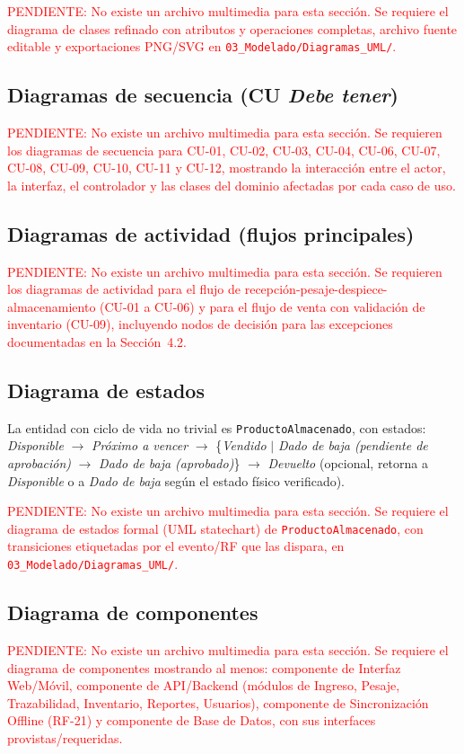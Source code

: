 \documentclass[11pt,a4paper]{article}
\begin{document}
\textcolor{red}{PENDIENTE: No existe un archivo multimedia para esta sección. Se requiere el diagrama de clases refinado con atributos y operaciones completas, archivo fuente editable y exportaciones PNG/SVG en \texttt{03\_Modelado/Diagramas\_UML/}.}

\subsection{Diagramas de secuencia (CU \textit{Debe tener})}
\textcolor{red}{PENDIENTE: No existe un archivo multimedia para esta sección. Se requieren los diagramas de secuencia para CU-01, CU-02, CU-03, CU-04, CU-06, CU-07, CU-08, CU-09, CU-10, CU-11 y CU-12, mostrando la interacción entre el actor, la interfaz, el controlador y las clases del dominio afectadas por cada caso de uso.}

\subsection{Diagramas de actividad (flujos principales)}
\textcolor{red}{PENDIENTE: No existe un archivo multimedia para esta sección. Se requieren los diagramas de actividad para el flujo de recepción-pesaje-despiece-almacenamiento (CU-01 a CU-06) y para el flujo de venta con validación de inventario (CU-09), incluyendo nodos de decisión para las excepciones documentadas en la Sección~4.2.}

\subsection{Diagrama de estados}
La entidad con ciclo de vida no trivial es \texttt{ProductoAlmacenado}, con estados: \textit{Disponible} $\rightarrow$ \textit{Próximo a vencer} $\rightarrow$ \{\textit{Vendido} $\mid$ \textit{Dado de baja (pendiente de aprobación)} $\rightarrow$ \textit{Dado de baja (aprobado)}\} $\rightarrow$ \textit{Devuelto} (opcional, retorna a \textit{Disponible} o a \textit{Dado de baja} según el estado físico verificado).

\textcolor{red}{PENDIENTE: No existe un archivo multimedia para esta sección. Se requiere el diagrama de estados formal (UML statechart) de \texttt{ProductoAlmacenado}, con transiciones etiquetadas por el evento/RF que las dispara, en \texttt{03\_Modelado/Diagramas\_UML/}.}

\subsection{Diagrama de componentes}
\textcolor{red}{PENDIENTE: No existe un archivo multimedia para esta sección. Se requiere el diagrama de componentes mostrando al menos: componente de Interfaz Web/Móvil, componente de API/Backend (módulos de Ingreso, Pesaje, Trazabilidad, Inventario, Reportes, Usuarios), componente de Sincronización Offline (RF-21) y componente de Base de Datos, con sus interfaces provistas/requeridas.}
\end{document}
